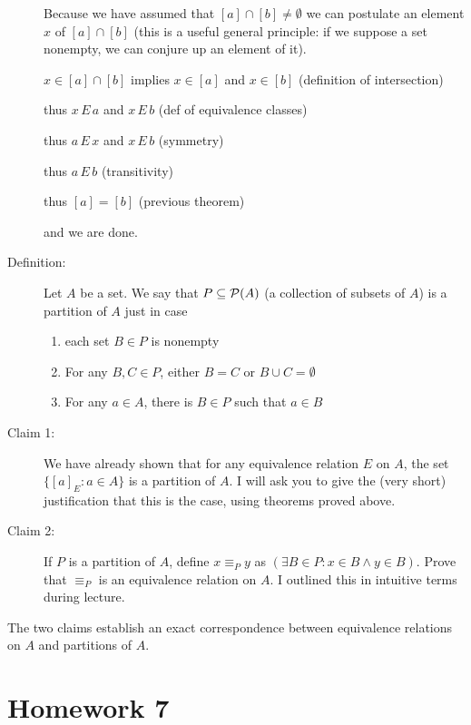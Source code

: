 \documentclass[12pt]{article}
\begin{document}
\begin{description}
Because we have assumed that $[a] \cap [b] \neq  \emptyset$ we can postulate an element $x$ of $[a] \cap [b]$
(this is a useful general principle:  if we suppose a set nonempty, we can conjure up an element of it).

$x \in [a] \cap [b]$ implies $x \in [a]$ and $x \in [b]$ (definition of intersection)

thus $x \,E \,a$ and $x \, E \, b$ (def of equivalence classes)

thus $a \, E \,x$ and $x \, E \, b$ (symmetry)

thus $a \, E \, b$ (transitivity)

thus $[a] = [b]$ (previous theorem)

and we are done.

\item[Definition:]  Let $A$ be a set.  We say that $P \subseteq {\cal P}(A)$ (a collection of subsets of $A$) is a partition of $A$ just in case

\begin{enumerate}

\item each set $B \in P$ is nonempty

\item  For any $B,C \in P$, either $B=C$ or $B \cup C=\emptyset$

\item  For any $a \in A$, there is $B \in P$ such that $a \in B$

\end{enumerate}

\item[Claim 1:]  We have already shown that for any equivalence relation $E$ on $A$, the set $\{[a]_E:a \in A\}$ is a partition of $A$.  I will ask you to give the (very short) justification that this is the case, using theorems proved above.

\item[Claim 2:]  If $P$ is a partition of $A$, define $x \equiv_P y$ as $(\exists B \in P:x \in B \wedge y \in B)$.  Prove that $\equiv_P$ is an equivalence relation on $A$.  I outlined this in intuitive terms during lecture.

\end{description}

The two claims establish an exact correspondence between equivalence relations on $A$ and partitions of $A$.


\newpage
\section{Homework 7}
\end{document}
